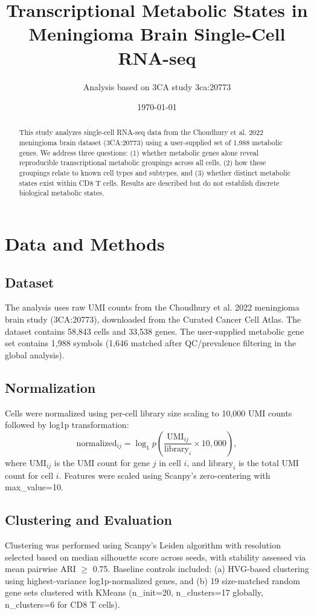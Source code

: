 \documentclass[11pt]{article}
\title{Transcriptional Metabolic States in Meningioma Brain Single-Cell RNA-seq}
\author{Analysis based on 3CA study 3ca:20773}
\date{\today}
\begin{document}
\maketitle

\begin{abstract}
This study analyzes single-cell RNA-seq data from the Choudhury et al. 2022 meningioma brain dataset (3CA:20773) using a user-supplied set of 1,988 metabolic genes. We address three questions: (1) whether metabolic genes alone reveal reproducible transcriptional metabolic groupings across all cells, (2) how these groupings relate to known cell types and subtypes, and (3) whether distinct metabolic states exist within CD8 T cells. Results are described but do not establish discrete biological metabolic states.
\end{abstract}

\section{Data and Methods}

\subsection{Dataset}
The analysis uses raw UMI counts from the Choudhury et al. 2022 meningioma brain study (3CA:20773), downloaded from the Curated Cancer Cell Atlas. The dataset contains 58,843 cells and 33,538 genes. The user-supplied metabolic gene set contains 1,988 symbols (1,646 matched after QC/prevalence filtering in the global analysis).

\subsection{Normalization}
Cells were normalized using per-cell library size scaling to 10,000 UMI counts followed by log1p transformation:
\begin{equation}
    \text{normalized}_{ij} = \log_1p\left(\frac{\text{UMI}_{ij}}{\text{library}_i} \times 10,000\right),
\end{equation}
where $\text{UMI}_{ij}$ is the UMI count for gene $j$ in cell $i$, and $\text{library}_i$ is the total UMI count for cell $i$. Features were scaled using Scanpy's zero-centering with max_value=10.

\subsection{Clustering and Evaluation}
Clustering was performed using Scanpy's Leiden algorithm with resolution selected based on median silhouette score across seeds, with stability assessed via mean pairwise ARI $\ge$ 0.75. Baseline controls included: (a) HVG-based clustering using highest-variance log1p-normalized genes, and (b) 19 size-matched random gene sets clustered with KMeans (n_init=20, n_clusters=17 globally, n_clusters=6 for CD8 T cells).
\end{document}
